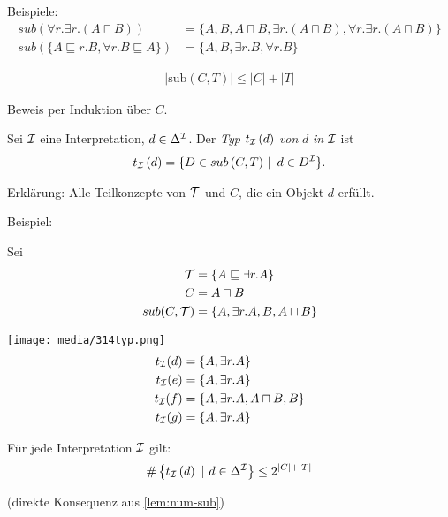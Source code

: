 \begin{tafel}
Beispiele:
\begin{align*}
    sub(\forall r.\exists r.(A \sqcap B)) &= \{A,B,A \sqcap B, \exists r.(A \sqcap B), \forall r.\exists r.(A \sqcap B)\}\\
    sub(\{A \sqsubseteq r.B, \forall r.B \sqsubseteq A\}) &= \{A,B, \exists r.B, \forall r.B\}
\end{align*}
\end{tafel}

\begin{lemma}
    \label{lem:num-sub}
    \begin{align*}
\left| \text{sub}\left( C,T \right) \right| \leq \left| C \right| + \left| T \right|
\end{align*}
\end{lemma}
Beweis per Induktion über $C$.

\begin{definition}
Sei $\mathcal{I}$ eine Interpretation, $d \in \Delta^{\mathcal{I}}$. Der \emph{Typ}
$t_{\mathcal{I}}\left( d \right)$ \emph{von} $d$ \emph{in} $\mathcal{I}$ ist
\begin{align*}
t_{\MI}\left( d \right) = \left\{ D \in sub\left( C,T \right)\  \right|\ d \in D^{\MI}\}.
\end{align*}
\end{definition}
Erklärung: Alle Teilkonzepte von $\mathcal{T}$ und $C$, die ein Objekt $d$
erfüllt.

\begin{tafel}
    \label{t:typen}
Beispiel:

Sei
\begin{align*}
    \mathcal{T} &=\{A \sqsubseteq \exists r.A\}\\
    C &= A \sqcap B\\
    sub(C,\mathcal{T}) &= \{A, \exists r.A, B, A \sqcap B\}
\end{align*}

\texttt{[image: media/314typ.png]}
\begin{align*}
    t_{\mathcal{I}}(d)&=\{A, \exists r.A\}\\
    t_{\mathcal{I}}(e)&=\{A, \exists r.A\}\\
    t_{\mathcal{I}}(f)&=\{A, \exists r.A, A \sqcap B, B\}\\
    t_{\mathcal{I}}(g)&=\{A, \exists r.A\}
\end{align*}
\end{tafel}

\begin{lemma}
    \label{lem:num-typ}
Für jede Interpretation $\mathcal{I}$ gilt:
\begin{align*}
\#\left\{ t_{\mathcal{I}}\left( d \right)\ |\ d \in \Delta^{\mathcal{I}} \right\} \leq 2^{\left| C \right| + |T|}
\end{align*}
\end{lemma}
(direkte Konsequenz aus \autoref{lem:num-sub})

